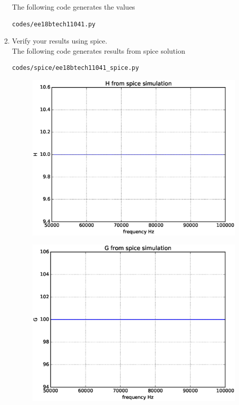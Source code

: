\begin{enumerate}[label=\arabic*.,ref=\theenumi]
%
% 

    
The following code generates the values
\begin{lstlisting}
codes/ee18btech11041.py
\end{lstlisting}

\item Verify your results using spice.
\\
\solution
The following code generates results from spice solution

\begin{lstlisting}
codes/spice/ee18btech11041_spice.py
\end{lstlisting}

\begin{figure}[!ht]
\centering
\includegraphics[width=\columnwidth]{./figs/H1.eps}
\caption{}
\label{fig:ee18btech11041_fig8}
\end{figure}


\begin{figure}[!ht]
\centering
\includegraphics[width=\columnwidth]{./figs/G1.eps}
\caption{}
\label{fig:ee18btech11041_fig9}
\end{figure}



\end{enumerate}
